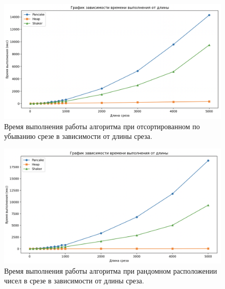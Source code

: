 \begin{figure}[h]
	\centering
	\includegraphics[height=0.35\textheight]{img/descend.png}
	\caption{Время выполнения работы алгоритма при отсортированном по убыванию срезе
    в зависимости от длины среза.}
	\label{img:desc}
\end{figure}

\begin{figure}[h]
	\centering
	\includegraphics[height=0.35\textheight]{img/random.png}
	\caption{Время выполнения работы алгоритма при рандомном расположении чисел в срезе
    в зависимости от длины среза.}
	\label{img:random}
\end{figure}

\clearpage

